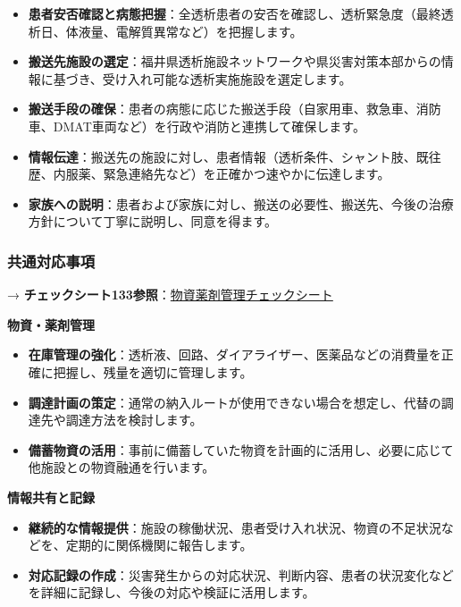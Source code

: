 \documentclass[
  japanese,
  letterpaper,
  DIV=11,
  numbers=noendperiod]{scrartcl}
\providecommand{\tightlist}{%
  \setlength{\itemsep}{0pt}\setlength{\parskip}{0pt}}
\begin{document}
\begin{itemize}
\tightlist
\item
  \textbf{患者安否確認と病態把握}：全透析患者の安否を確認し、透析緊急度（最終透析日、体液量、電解質異常など）を把握します。
\item
  \textbf{搬送先施設の選定}：福井県透析施設ネットワークや県災害対策本部からの情報に基づき、受け入れ可能な透析実施施設を選定します。
\item
  \textbf{搬送手段の確保}：患者の病態に応じた搬送手段（自家用車、救急車、消防車、DMAT車両など）を行政や消防と連携して確保します。
\item
  \textbf{情報伝達}：搬送先の施設に対し、患者情報（透析条件、シャント肢、既往歴、内服薬、緊急連絡先など）を正確かつ速やかに伝達します。
\item
  \textbf{家族への説明}：患者および家族に対し、搬送の必要性、搬送先、今後の治療方針について丁寧に説明し、同意を得ます。
\end{itemize}

\subsubsection{共通対応事項}\label{ux5171ux901aux5bfeux5fdcux4e8bux9805}

→
\textbf{チェックシート133参照}：\href{1321_物資薬剤管理チェックシート.qmd}{物資薬剤管理チェックシート}

\textbf{物資・薬剤管理}

\begin{itemize}
\tightlist
\item
  \textbf{在庫管理の強化}：透析液、回路、ダイアライザー、医薬品などの消費量を正確に把握し、残量を適切に管理します。
\item
  \textbf{調達計画の策定}：通常の納入ルートが使用できない場合を想定し、代替の調達先や調達方法を検討します。
\item
  \textbf{備蓄物資の活用}：事前に備蓄していた物資を計画的に活用し、必要に応じて他施設との物資融通を行います。
\end{itemize}

\textbf{情報共有と記録}

\begin{itemize}
\tightlist
\item
  \textbf{継続的な情報提供}：施設の稼働状況、患者受け入れ状況、物資の不足状況などを、定期的に関係機関に報告します。
\item
  \textbf{対応記録の作成}：災害発生からの対応状況、判断内容、患者の状況変化などを詳細に記録し、今後の対応や検証に活用します。
\end{itemize}
\end{document}
